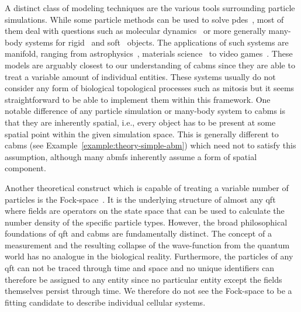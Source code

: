 
A distinct class of modeling techniques are the various tools surrounding particle simulations.
While some particle methods can be used to solve \acp{pde}~\cite{Monaghan1992,Monaghan2005}, most of
them deal with questions such as molecular dynamics~\cite{Allen1989} or more generally many-body
systems for rigid~\cite{Baraff1994} and soft~\cite{Terzopoulos1987} objects.
The applications of such systems are manifold, ranging from astrophysics~\cite{Springel2005},
materials science~\cite{Cundall1979} to video games~\cite{Mller2007}.
These models are arguably closest to our understanding of \acp{cabm} since they are able to treat a
variable amount of individual entities.
These systems usually do not consider any form of biological topological processes such as mitosis
but it seems straightforward to be able to implement them within this framework.
One notable difference of any particle simulation or many-body system to \acp{cabm} is that they are
inherently spatial, i.e., every object has to be present at some spatial point within the given
simulation space.
This is generally different to \acp{cabm} (see Example~\ref{example:theory-simple-abm}) which need
not to satisfy this assumption, although many \acp{abmf} inherently assume a form of spatial
component.

Another theoretical construct which is capable of treating a variable number of particles is the
Fock-space~\cite{Fock1932}.
It is the underlying structure of almost any \ac{qft} where fields are operators on the state space
that can be used to calculate the number density of the specific particle types.
However, the broad philosophical foundations of \ac{qft} and \acp{cabm} are fundamentally distinct.
The concept of a measurement and the resulting collapse of the wave-function from the quantum world
has no analogue in the biological reality.
Furthermore, the particles of any \ac{qft} can not be traced through time and space and no unique
identifiers can therefore be assigned to any entity since no particular entity except the fields
themselves persist through time.
We therefore do not see the Fock-space to be a fitting candidate to describe individual cellular
systems.

